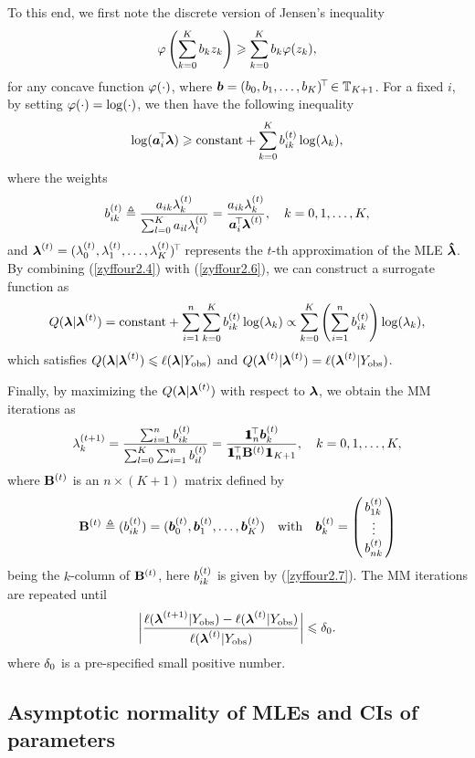 To this end, we first note the discrete version of Jensen's inequality
$$
    \varphi\left(\sum_{k=0}^K b_k z_k \right) \geqslant \sum_{k=0}^K b_k \varphi(z_k),
$$
for any concave function $\varphi(\cdot)$, where ${\boldsymbol{b}}=(b_0, b_1, \dots, b_K)^{\!\top\!} \in {\mathbb{T}}_{K+1}$. For a fixed $i$, by setting $\varphi(\cdot) = \log(\cdot)$, we then have the following inequality
\begin{eqnarray} \label{zyffour2.6}
   \log ({\boldsymbol{a}}_i^{\!\top\!}{\boldsymbol{\lambda}}) \geqslant \mbox{constant} + \sum_{k=0}^K b^{(t)}_{ik} \log(\lambda_k),
\end{eqnarray}
where the weights
\begin{eqnarray} \label{zyffour2.7}
   b^{(t)}_{ik} \triangleq \frac{a_{ik}\lambda^{(t)}_k}{\sum_{l=0}^K a_{il}\lambda^{(t)}_l} = \frac{a_{ik}\lambda^{(t)}_k}{{\boldsymbol{a}}_i^{\!\top\!}{\boldsymbol{\lambda}}^{(t)}}, \quad k=0, 1, \dots, K,
\end{eqnarray}
and ${\boldsymbol{\lambda}}^{(t)} =(\lambda^{(t)}_0, \lambda^{(t)}_1, \dots, \lambda^{(t)}_K)^{\!\top\!}$ represents the $t$-th approximation of the MLE $\mbox{\boldmath${\hat \lambda}$}$. By combining (\ref{zyffour2.4}) with (\ref{zyffour2.6}), we can construct a surrogate function as
\begin{eqnarray*}
   Q({\boldsymbol{\lambda}}|{\boldsymbol{\lambda}}^{(t)}) = \mbox{constant} + \sum_{i=1}^n \sum_{k=0}^K b^{(t)}_{ik} \log(\lambda_k) \propto \sum_{k=0}^K \left(\sum_{i=1}^n b^{(t)}_{ik} \right) \log(\lambda_k),
\end{eqnarray*}
which satisfies $Q({\boldsymbol{\lambda}}|{\boldsymbol{\lambda}}^{(t)}) \leqslant \ell({\boldsymbol{\lambda}}|Y_{\rm obs})$ and $Q({\boldsymbol{\lambda}}^{(t)}|{\boldsymbol{\lambda}}^{(t)}) = \ell({\boldsymbol{\lambda}}^{(t)}|Y_{\rm obs})$.

Finally, by maximizing the $Q({\boldsymbol{\lambda}}|{\boldsymbol{\lambda}}^{(t)})$ with respect to ${\boldsymbol{\lambda}}$, we obtain the MM iterations as
\begin{eqnarray} \label{zyffour2.8}
   \latI_k = \frac{\sum_{i=1}^n \bt{ik}} {\sum_{l=0}^K \sum_{i=1}^n \bt{il}} = \frac{\1_n^{\T} \ibbt{k}}{\1_n^{\T} \bBt \1_{K+1}}, \quad k = 0, 1,\ldots, K,
\end{eqnarray}
where ${\bf B}^{(t)}$ is an $n \times (K+1)$ matrix defined by
$$
   {\bf B}^{(t)} \triangleq (b^{(t)}_{ik}) = ({\boldsymbol{b}}^{(t)}_{0}, {\boldsymbol{b}}^{(t)}_{1}, \dots, {\boldsymbol{b}}^{(t)}_{K}) \quad \mbox{with} \quad {\boldsymbol{b}}^{(t)}_{k} = \left(\!\!\begin{array}{c} b^{(t)}_{1k} \\ \vdots \\ b^{(t)}_{nk} \end{array} \!\!\right)
$$
being the $k$-column of ${\bf B}^{(t)}$, here $b^{(t)}_{ik}$ is given by (\ref{zyffour2.7}). The MM iterations are repeated until
$$
   \bigg|\frac{\ell({\boldsymbol{\lambda}}^{(t+1)}|Y_{\rm obs}) - \ell({\boldsymbol{\lambda}}^{(t)}|Y_{\rm obs})} {\ell({\boldsymbol{\lambda}}^{(t)}|Y_{\rm obs})}\bigg| \leqslant \delta_0.
$$
where $\delta_0$ is a pre-specified small positive number.


\subsection{Asymptotic normality of MLEs and CIs of parameters}      %

